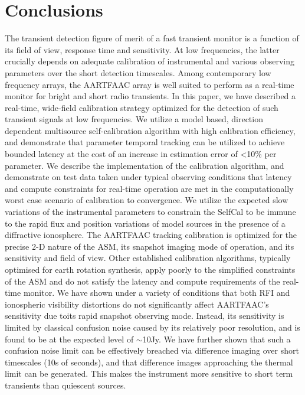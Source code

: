 \documentclass{aa}
\begin{document}
\section{Conclusions}

The  transient detection  figure  of merit  of  a fast  transient  monitor is  a
function  of  its  field  of  view,  response  time  and  sensitivity.   At  low
frequencies,   the  latter   crucially  depends   on  adequate   calibration  of
instrumental  and   various  observing  parameters  over   the  short  detection
timescales.  Among contemporary low frequency arrays, the AARTFAAC array is well
suited to perform as a real-time  monitor for bright and short radio transients.
In this  paper, we have  described a real-time, wide-field  calibration strategy
optimized for  the detection of such  transient signals at  low frequencies.  We
utilize  a   model  based,  direction   dependent  multisource  self-calibration
algorithm  with  high calibration  efficiency,  and  demonstrate that  parameter
temporal tracking can  be utilized to achieve bounded latency at  the cost of an
increase  in  estimation  error  of   <10\%  per  parameter.   We  describe  the
implementation of the calibration algorithm,  and demonstrate on test data taken
under  typical observing  conditions that  latency and  compute  constraints for
real-time  operation are  met  in  the computationally  worst  case scenario  of
calibration  to convergence.   We utilize  the expected  slow variations  of the
instrumental parameters to constrain the SelfCal  to be immune to the rapid flux
and  position variations  of  model sources  in  the presence  of a  diffractive
ionosphere.  The AARTFAAC tracking calibration  is optimized for the precise 2-D
nature of the  ASM, its snapshot imaging mode of  operation, and its sensitivity
and field of view. Other established calibration algorithms, typically optimised
for earth rotation synthesis, apply  poorly to the simplified constraints of the
ASM and  do not satisfy  the latency and  compute requirements of  the real-time
monitor.   We  have shown  under  a  variety of  conditions  that  both RFI  and
ionospheric  visibility  distortions  do  not  significantly  affect  AARTFAAC's
sensitivity due  toits rapid snapshot observing mode.   Instead, its sensitivity
is  limited  by  classical  confusion   noise  caused  by  its  relatively  poor
resolution, and  is found to  be at the  expected level of $\sim$10Jy.   We have
further shown that such a confusion  noise limit can be effectively breached via
difference imaging over  short timescales (10s of seconds),  and that difference
images approaching the thermal limit can be generated. This makes the instrument
more sensitive to short term transients than quiescent sources.
\end{document}
